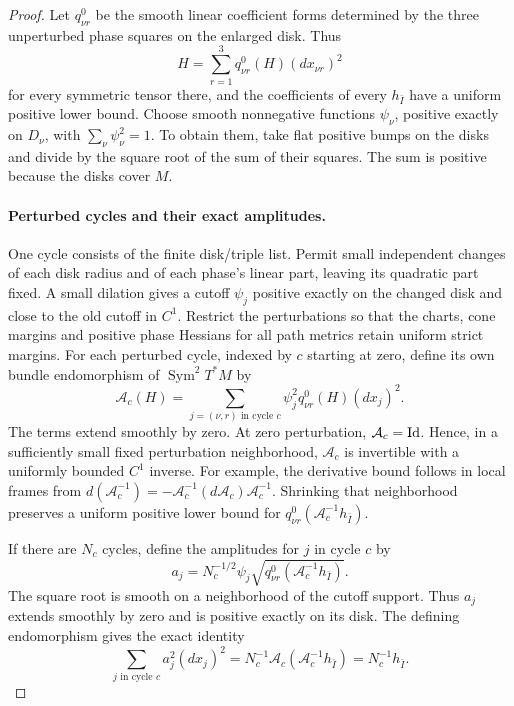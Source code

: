 \begin{proof}
Let $q_{\nu r}^0$ be the smooth linear coefficient forms determined by the
three unperturbed phase squares on the enlarged disk.  Thus
\[
 H=\sum_{r=1}^3q_{\nu r}^0(H)(dx_{\nu r})^2
\]
for every symmetric tensor there, and the coefficients of every
$h_{\bar I}$ have a uniform positive lower bound.  Choose smooth nonnegative
functions $\psi_\nu$, positive exactly on $D_\nu$, with
$\sum_\nu\psi_\nu^2=1$.  To obtain them, take flat positive bumps on the
disks and divide by the square root of the sum of their squares.  The sum
is positive because the disks cover $M$.

\paragraph{Perturbed cycles and their exact amplitudes.}
One cycle consists of the finite disk/triple list.  Permit small independent
changes of each disk radius and of each phase's linear part, leaving its
quadratic part fixed.  A small dilation gives a cutoff $\psi_j$ positive
exactly on the changed disk and close to the old cutoff in $C^1$.  Restrict
the perturbations so that the charts, cone margins and positive phase
Hessians for all path metrics retain uniform strict margins.  For each
perturbed cycle, indexed by $c$ starting at zero, define its own bundle endomorphism of
$\operatorname{Sym}^2T^*M$ by
\[
 \mathcal A_c(H)=\sum_{j=(\nu,r)\text{ in cycle }c}
       \psi_j^2 q_{\nu r}^0(H)(dx_j)^2.
\]
The terms extend smoothly by zero.  At zero perturbation, $\mathcal A_c=\operatorname{Id}$.
Hence, in a sufficiently small fixed perturbation neighborhood,
$\mathcal A_c$ is invertible with a uniformly bounded $C^1$ inverse.
For example, the derivative bound follows in local frames from
$d(\mathcal A_c^{-1})=-\mathcal A_c^{-1}(d\mathcal A_c)\mathcal A_c^{-1}$.
Shrinking that neighborhood preserves a uniform positive lower bound for
$q_{\nu r}^0(\mathcal A_c^{-1}h_{\bar I})$.

If there are $N_c$ cycles, define the amplitudes for $j$ in cycle $c$ by
\begin{equation}
 a_j=N_c^{-1/2}\psi_j
          \sqrt{q_{\nu r}^0(\mathcal A_c^{-1}h_{\bar I})}.
 \label{eq:global-amplitudes}
\end{equation}
The square root is smooth on a neighborhood of the cutoff support.  Thus
$a_j$ extends smoothly by zero and is positive exactly on its disk.  The
defining endomorphism gives the exact identity
\begin{equation}
 \sum_{j\text{ in cycle }c}a_j^2(dx_j)^2
 =N_c^{-1}\mathcal A_c(\mathcal A_c^{-1}h_{\bar I})
 =N_c^{-1}h_{\bar I}.
 \label{eq:cycle-identity}
\end{equation}


\end{proof}
